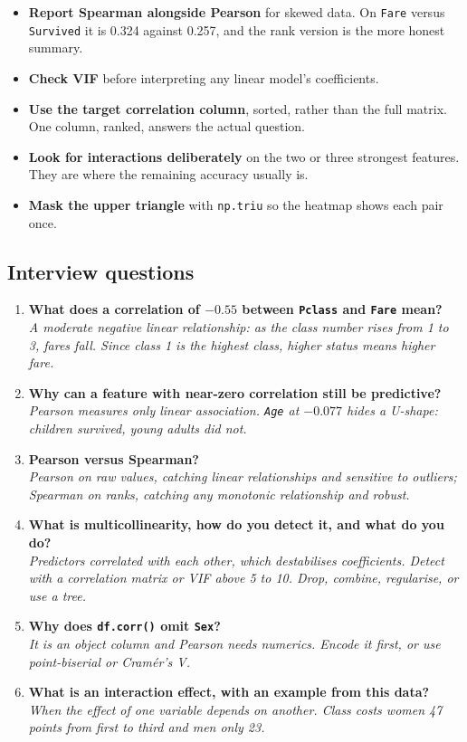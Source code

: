 \documentclass[11pt,a4paper]{article}
\begin{document}
\begin{itemize}\itemsep3pt
  \item \textbf{Report Spearman alongside Pearson} for skewed data. On \texttt{Fare} versus
        \texttt{Survived} it is 0.324 against 0.257, and the rank version is the more honest
        summary.
  \item \textbf{Check VIF} before interpreting any linear model's coefficients.
  \item \textbf{Use the target correlation column}, sorted, rather than the full matrix.
        One column, ranked, answers the actual question.
  \item \textbf{Look for interactions deliberately} on the two or three strongest features.
        They are where the remaining accuracy usually is.
  \item \textbf{Mask the upper triangle} with \lstinline|np.triu| so the heatmap shows each
        pair once.
\end{itemize}

\subsection*{Interview questions}

\begin{enumerate}\itemsep4pt
  \item \textbf{What does a correlation of $-0.55$ between \texttt{Pclass} and \texttt{Fare}
        mean?}\\
        \emph{A moderate negative linear relationship: as the class number rises from 1 to
        3, fares fall. Since class 1 is the highest class, higher status means higher fare.}
  \item \textbf{Why can a feature with near-zero correlation still be predictive?}\\
        \emph{Pearson measures only linear association. \texttt{Age} at $-0.077$ hides a
        U-shape: children survived, young adults did not.}
  \item \textbf{Pearson versus Spearman?}\\
        \emph{Pearson on raw values, catching linear relationships and sensitive to
        outliers; Spearman on ranks, catching any monotonic relationship and robust.}
  \item \textbf{What is multicollinearity, how do you detect it, and what do you do?}\\
        \emph{Predictors correlated with each other, which destabilises coefficients. Detect
        with a correlation matrix or VIF above 5 to 10. Drop, combine, regularise, or use a
        tree.}
  \item \textbf{Why does \lstinline|df.corr()| omit \texttt{Sex}?}\\
        \emph{It is an object column and Pearson needs numerics. Encode it first, or use
        point-biserial or Cramér's V.}
  \item \textbf{What is an interaction effect, with an example from this data?}\\
        \emph{When the effect of one variable depends on another. Class costs women 47
        points from first to third and men only 23.}
\end{enumerate}
\end{document}
